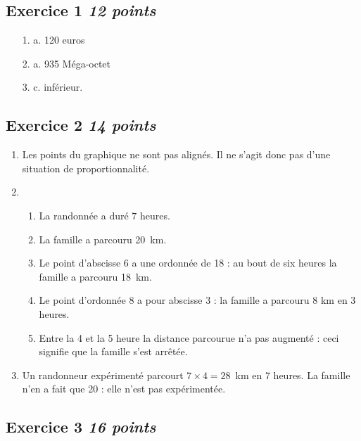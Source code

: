 \documentclass[10pt]{article}
\begin{document}
\setlength{\columnseprule}{1pt}


\subsection*{Exercice 1 \hfill \textit{12 points}}

\begin{enumerate}
    \item[1.] a. 120 euros
    \item[2.] a. 935 Méga-octet
    \item[3.]  c. inférieur.
\end{enumerate}    
\subsection*{Exercice 2 \hfill \textit{14 points}}


\begin{enumerate}
    \item Les points du graphique ne sont pas alignés. Il ne s'agit donc pas d'une situation de proportionnalité.
    \item 
        \begin{enumerate}
            \item La randonnée a duré  $7$ heures.
            \item La famille a parcouru 20~km.
            \item Le point d'abscisse 6 a une ordonnée de 18 : au bout de six heures la famille a parcouru 18~km.
            \item Le point d'ordonnée 8 a pour abscisse 3 : la famille a parcouru 8 km en 3 heures.
            \item Entre la 4 et la 5 heure la distance parcourue n'a pas augmenté : ceci signifie que la famille s'est arrêtée.		
        \end{enumerate}
    \item Un randonneur expérimenté parcourt $7 \times 4 = 28$~km en 7 heures. La famille n'en a fait que 20 : elle n'est pas expérimentée.
    \end{enumerate}
    

\subsection*{Exercice 3 \hfill \textit{16 points}}
\end{document}
